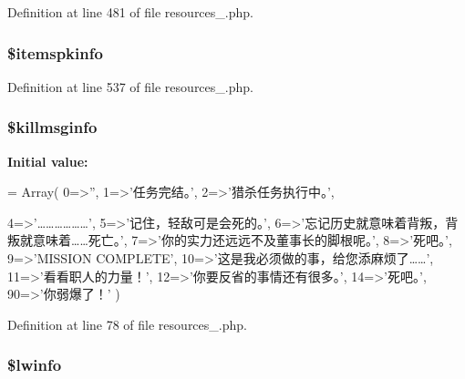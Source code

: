 Definition at line 481 of file resources\+\_.\+php.

\hypertarget{resources__1_8php_af5da654ca4941efa7e59e9608ad80106}{
\subsubsection[{\$itemspkinfo}]{\setlength{\rightskip}{0pt plus 5cm}\$itemspkinfo}}\label{resources__1_8php_af5da654ca4941efa7e59e9608ad80106}


Definition at line 537 of file resources\+\_.\+php.

\hypertarget{resources__1_8php_acfdab9efcdacf2869477a5e833712b40}{
\subsubsection[{\$killmsginfo}]{\setlength{\rightskip}{0pt plus 5cm}\$killmsginfo}}\label{resources__1_8php_acfdab9efcdacf2869477a5e833712b40}
{\bfseries Initial value\+:}
\begin{DoxyCode}
= Array(
    0=>\textcolor{stringliteral}{''},
    1=>\textcolor{stringliteral}{'任务完结。'},
    2=>\textcolor{stringliteral}{'猎杀任务执行中。'},
    
    4=>\textcolor{stringliteral}{'………………'},
    5=>\textcolor{stringliteral}{'记住，轻敌可是会死的。'},
    6=>\textcolor{stringliteral}{'忘记历史就意味着背叛，背叛就意味着……死亡。'},
    7=>\textcolor{stringliteral}{'你的实力还远远不及董事长的脚根呢。'},
    8=>\textcolor{stringliteral}{'死吧。'},
    9=>\textcolor{stringliteral}{'MISSION COMPLETE'},
    10=>\textcolor{stringliteral}{'这是我必须做的事，给您添麻烦了……'},
    11=>\textcolor{stringliteral}{'看看职人的力量！'},
    12=>\textcolor{stringliteral}{'你要反省的事情还有很多。'},
    14=>\textcolor{stringliteral}{'死吧。'},
    90=>\textcolor{stringliteral}{'你弱爆了！'}
    )
\end{DoxyCode}


Definition at line 78 of file resources\+\_.\+php.

\hypertarget{resources__1_8php_a8bc9ffb8d571d6f8b62846c5ba0b9749}{
\subsubsection[{\$lwinfo}]{\setlength{\rightskip}{0pt plus 5cm}\$lwinfo}}\label{resources__1_8php_a8bc9ffb8d571d6f8b62846c5ba0b9749}


